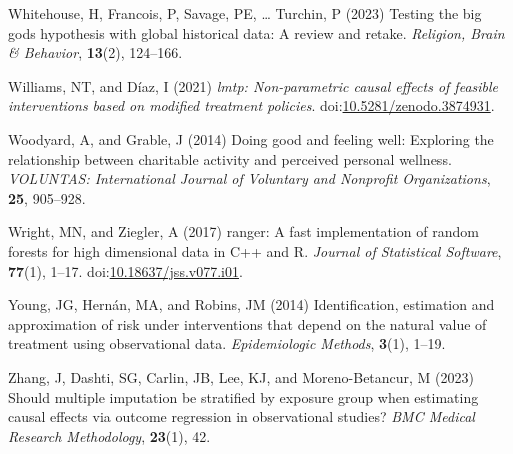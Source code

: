 \documentclass[
  single column]{article}
\newlength{\cslhangindent}
\newenvironment{CSLReferences}[2] %
 {\begin{list}{}{%
  \setlength{\itemindent}{0pt}
  \setlength{\leftmargin}{0pt}
  \setlength{\parsep}{0pt}
  \ifodd #1
   \setlength{\leftmargin}{\cslhangindent}
   \setlength{\itemindent}{-1\cslhangindent}
  \fi
  \setlength{\itemsep}{#2\baselineskip}}}
 {\end{list}}
\begin{document}
\begin{CSLReferences}{1}{0}
Whitehouse, H, Francois, P, Savage, PE, \ldots{} Turchin, P (2023)
Testing the big gods hypothesis with global historical data: A review
and retake. \emph{Religion, Brain \& Behavior}, \textbf{13}(2),
124--166.

Williams, NT, and Díaz, I (2021) \emph{{l}mtp: Non-parametric causal
effects of feasible interventions based on modified treatment policies}.
doi:\href{https://doi.org/10.5281/zenodo.3874931}{10.5281/zenodo.3874931}.

Woodyard, A, and Grable, J (2014) Doing good and feeling well: Exploring
the relationship between charitable activity and perceived personal
wellness. \emph{VOLUNTAS: International Journal of Voluntary and
Nonprofit Organizations}, \textbf{25}, 905--928.

Wright, MN, and Ziegler, A (2017) {ranger}: A fast implementation of
random forests for high dimensional data in {C++} and {R}. \emph{Journal
of Statistical Software}, \textbf{77}(1), 1--17.
doi:\href{https://doi.org/10.18637/jss.v077.i01}{10.18637/jss.v077.i01}.

Young, JG, Hernán, MA, and Robins, JM (2014) Identification, estimation
and approximation of risk under interventions that depend on the natural
value of treatment using observational data. \emph{Epidemiologic
Methods}, \textbf{3}(1), 1--19.

Zhang, J, Dashti, SG, Carlin, JB, Lee, KJ, and Moreno-Betancur, M (2023)
Should multiple imputation be stratified by exposure group when
estimating causal effects via outcome regression in observational
studies? \emph{BMC Medical Research Methodology}, \textbf{23}(1), 42.

\end{CSLReferences}
\end{document}
